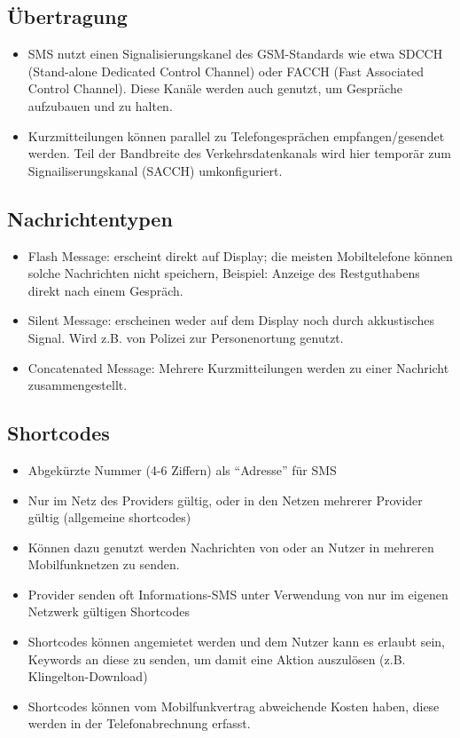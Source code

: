 \documentclass[german,12pt,a4paper]{article}
\begin{document}
\subsection{Übertragung}
\begin{itemize}
	\item SMS nutzt einen Signalisierungskanel des GSM-Standards wie etwa SDCCH (Stand-alone Dedicated Control Channel) 
		oder FACCH (Fast Associated Control Channel). Diese Kanäle werden auch genutzt, um Gespräche aufzubauen und zu 
		halten.
	\item Kurzmitteilungen können parallel zu Telefongesprächen empfangen/gesendet werden. Teil der Bandbreite des 
		Verkehrsdatenkanals wird hier temporär zum Signailiserungskanal (SACCH) umkonfiguriert.
\end{itemize}

\subsection{Nachrichtentypen}
\begin{itemize}
	\item Flash Message: erscheint direkt auf Display; die meisten Mobiltelefone können solche Nachrichten nicht speichern,
		Beispiel: Anzeige des Restguthabens direkt nach einem Gespräch.
	\item Silent Message: erscheinen weder auf dem Display noch durch akkustisches Signal. 
		Wird z.B. von Polizei zur Personenortung genutzt.
	\item Concatenated Message: Mehrere Kurzmitteilungen werden zu einer Nachricht zusammengestellt.
\end{itemize}

\subsection{Shortcodes}
\begin{itemize}
	\item Abgekürzte Nummer (4-6 Ziffern) als ``Adresse'' für SMS
	\item Nur im Netz des Providers gültig, oder in den Netzen mehrerer Provider gültig (allgemeine shortcodes)
	\item Können dazu genutzt werden Nachrichten von oder an Nutzer in mehreren Mobilfunknetzen zu senden.
	\item Provider senden oft Informations-SMS unter Verwendung von nur im eigenen Netzwerk gültigen Shortcodes
	\item Shortcodes können angemietet werden und dem Nutzer kann es erlaubt sein, Keywords an diese zu senden, um 
		damit eine Aktion auszulösen (z.B. Klingelton-Download)
	\item Shortcodes können vom Mobilfunkvertrag abweichende Kosten haben, diese werden in der Telefonabrechnung 
		erfasst.
\end{itemize}
\end{document}
